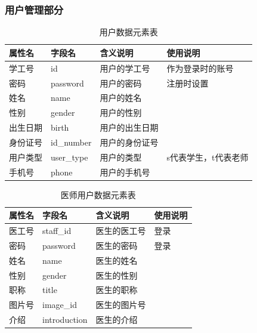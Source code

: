 \documentclass{article}
\begin{document}
\subsubsection{用户管理部分}

\begin{table}[H]
    \centering
    \begin{tabularx}{\textwidth}{|p{2.2cm}|p{3.2cm}|p{4.8cm}|p{5cm}|}
    \toprule
    \textbf{属性名} & \textbf{字段名} & \textbf{含义说明} & \textbf{使用说明} \\ \midrule
    学工号 & id & 用户的学工号 & 作为登录时的账号 \\ \midrule
    密码 & password & 用户的密码 & 注册时设置 \\ \midrule
    姓名 & name & 用户的姓名 & \\ \midrule
    性别 & gender & 用户的性别 &  \\ \midrule
    出生日期 & birth & 用户的出生日期 &  \\ \midrule
    身份证号 & id\_number & 用户的身份证号 &  \\ \midrule
    用户类型 & user\_type & 用户的类型 & s代表学生，t代表老师 \\ \midrule
    手机号 & phone & 用户的手机号 &  \\ \bottomrule
    \end{tabularx}
    \caption{用户数据元素表}
    \label{tab:student_user_elements}
\end{table}

\begin{table}[H]
    \centering
    \begin{tabularx}{\textwidth}{|p{2.2cm}|p{3.2cm}|p{4.8cm}|p{5cm}|}
    \toprule
    \textbf{属性名} & \textbf{字段名} & \textbf{含义说明} & \textbf{使用说明} \\ \midrule
    医工号 & staff\_id & 医生的医工号 & 登录 \\ \midrule
    密码 & password & 医生的密码 & 登录 \\ \midrule
    姓名 & name & 医生的姓名 &  \\ \midrule
    性别 & gender & 医生的性别 &  \\ \midrule
    职称 & title & 医生的职称 &  \\ \midrule
    图片号 & image\_id & 医生的图片号 &  \\ \midrule
    介绍 & introduction & 医生的介绍 &  \\ \bottomrule
    \end{tabularx}
    \caption{医师用户数据元素表}
    \label{tab:doctor_user_elements}
\end{table}
\end{document}
